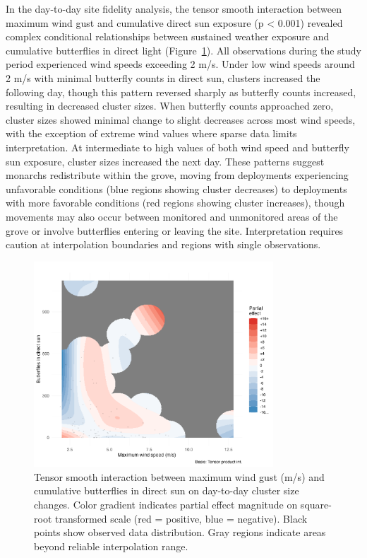 In the day-to-day site fidelity analysis, the tensor smooth interaction between maximum wind gust and cumulative direct sun exposure (p < 0.001) revealed complex conditional relationships between sustained weather exposure and cumulative butterflies in direct light (Figure~\ref{fig:interaction_wind_sun_sunset}). All observations during the study period experienced wind speeds exceeding 2 m/s. Under low wind speeds around 2 m/s with minimal butterfly counts in direct sun, clusters increased the following day, though this pattern reversed sharply as butterfly counts increased, resulting in decreased cluster sizes. When butterfly counts approached zero, cluster sizes showed minimal change to slight decreases across most wind speeds, with the exception of extreme wind values where sparse data limits interpretation. At intermediate to high values of both wind speed and butterfly sun exposure, cluster sizes increased the next day. These patterns suggest monarchs redistribute within the grove, moving from deployments experiencing unfavorable conditions (blue regions showing cluster decreases) to deployments with more favorable conditions (red regions showing cluster increases), though movements may also occur between monitored and unmonitored areas of the grove or involve butterflies entering or leaving the site. Interpretation requires caution at interpolation boundaries and regions with single observations. 

\begin{figure}[htbp]
    \centering
    \includegraphics[width=0.8\textwidth]{supplemental/results/sunset/figures/interaction_wind_x_sun_binned.png}
    \caption{Tensor smooth interaction between maximum wind gust (m/s) and cumulative butterflies in direct sun on day-to-day cluster size changes. Color gradient indicates partial effect magnitude on square-root transformed scale (red = positive, blue = negative). Black points show observed data distribution. Gray regions indicate areas beyond reliable interpolation range.}
    \label{fig:interaction_wind_sun_sunset}
\end{figure}

